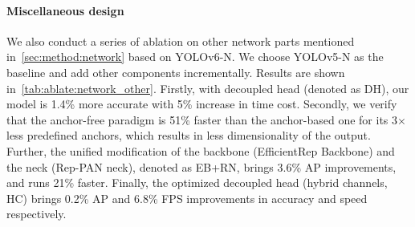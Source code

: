 \documentclass[10pt,twocolumn,letterpaper]{article}
\begin{document}
  \paragraph{Miscellaneous design}
  We also conduct a series of ablation on other network parts mentioned in~\cref{sec:method:network} based on YOLOv6-N. We choose YOLOv5-N as the baseline and add other components incrementally. Results are shown in~\cref{tab:ablate:network_other}. Firstly, with decoupled head (denoted as DH), our model is 1.4\% more accurate with 5\% increase in time cost. Secondly, we verify that the anchor-free paradigm is 51\% faster than the anchor-based one for its 3$\times$ less predefined anchors, which results in less dimensionality of the output. Further, the unified modification of the backbone (EfficientRep Backbone) and the neck (Rep-PAN neck), denoted as EB+RN, brings 3.6\% AP improvements, and runs 21\% faster. Finally, the optimized decoupled head (hybrid channels, HC) brings 0.2\% AP and 6.8\% FPS improvements in accuracy and speed respectively.

  \begin{table}
    \centering
    \caption{Ablation study on all network designs in an incremental way. FPS is tested with FP16-precision and batch-size=32 on Tesla T4 GPUs.}
    \label{tab:ablate:network_other}
  \end{table}
\end{document}
